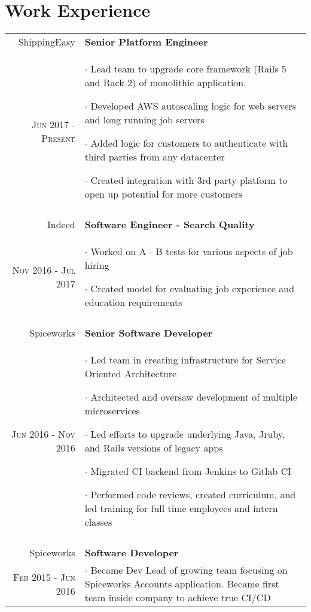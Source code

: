 \documentclass[a4paper,10pt]{article}
\begin{document}
\section{Work Experience}
\begin{tabular}{r|p{11cm}}
 ShippingEasy & \textbf{Senior Platform Engineer} \\
 \textsc{Jun 2017 - Present} &
	\footnotesize{
		$\cdot$ Lead team to upgrade core framework (Rails 5 and Rack 2) of monolithic application.

		$\cdot$ Developed AWS autoscaling logic for web servers and long running job servers

		$\cdot$ Added logic for customers to authenticate with third parties from any datacenter

		$\cdot$ Created integration with 3rd party platform to open up potential for more customers
	}
	\\\multicolumn{2}{c}{} \\

	Indeed & \textbf{Software Engineer - Search Quality} \\
	\textsc{Nov 2016 - Jul 2017} &
	 \footnotesize{
		 $\cdot$ Worked on A - B tests for various aspects of job hiring

		 $\cdot$ Created model for evaluating job experience and education requirements
	 }
	 \\\multicolumn{2}{c}{} \\

	 Spiceworks & \textbf{Senior Software Developer} \\
	 \textsc{Jun 2016 - Nov 2016} &
		\footnotesize{
			$\cdot$ Led team in creating infrastructure for Service Oriented Architecture

			$\cdot$ Architected and oversaw development of multiple microservices

			$\cdot$ Led efforts to upgrade underlying Java, Jruby, and Rails versions of legacy apps

			$\cdot$ Migrated CI backend from Jenkins to Gitlab CI

			$\cdot$ Performed code reviews, created curriculum, and led training for full time employees and intern classes
		}
		\\\multicolumn{2}{c}{} \\

	Spiceworks & \textbf{Software Developer} \\
	\textsc{Feb 2015 - Jun 2016} &
	 \footnotesize{

		 $\cdot$ Became Dev Lead of growing team focusing on Spiceworks Accounts application.
		 Became first team inside company to achieve true CI/CD

}
\end{tabular}
\end{document}
